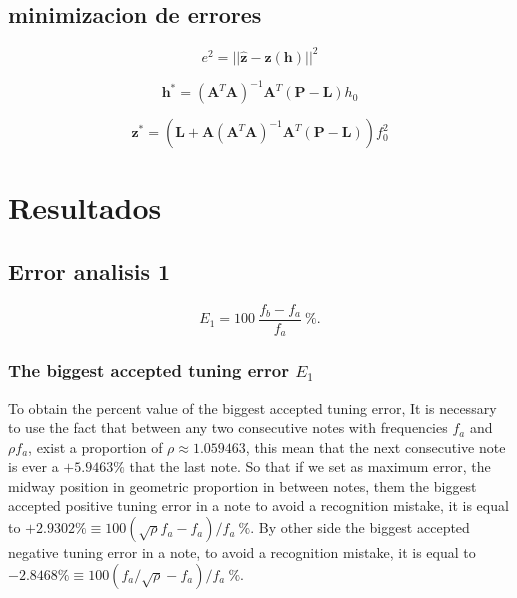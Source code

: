 \documentclass{article}
\begin{document}
\subsection{minimizacion de errores}

\begin{equation}
e^2= || \mathbf{\hat{z}} - \mathbf{z}(\mathbf{h}) ||^2
\end{equation}

\begin{equation}
\mathbf{h}^{*}=
 \left(\mathbf{A}^T\mathbf{A}\right)^{-1}\mathbf{A}^T
 \left(\mathbf{P}-\mathbf{L}\right)
h_0
\end{equation}


\begin{equation}
\mathbf{z}^{*}=
\left(\mathbf{L}
+\mathbf{A}\left(\mathbf{A}^T\mathbf{A}\right)^{-1}\mathbf{A}^T
 \left(\mathbf{P}-\mathbf{L}\right) \right)
f_0^2
\end{equation}


\section{Resultados}

\subsection{Error analisis 1}
\begin{equation}
E_1=100~\frac{f_b-f_a}{f_a}~\%. 
\end{equation}

\subsubsection{The biggest accepted tuning error $E_1$}
\label{subsubsec:max:E1}
To obtain the percent value of the biggest accepted tuning error,
It is necessary to use the fact that between any two consecutive notes with frequencies
$f_a$ and $\rho f_a$, exist a proportion of $\rho\approx 1.059463$, this mean
that the next consecutive note is ever a $+5.9463\%$ that the last note. So that
if we set as maximum error, the midway position in geometric proportion in between notes, them 
the biggest accepted positive tuning error in a note  
to avoid a recognition mistake, it is equal to $+2.9302\% \equiv 100 (\sqrt{\rho}f_a-f_a)/f_a~\%$.
By other side 
the biggest accepted negative tuning error in a note, 
to avoid a recognition mistake, it is equal to $-2.8468\% \equiv 100 (f_a/\sqrt{\rho}-f_a)/f_a~\%$.
\end{document}
